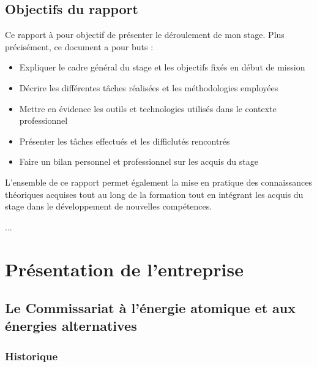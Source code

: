 \documentclass[12pt,a4paper]{report}
\begin{document}
\section{Objectifs du rapport}
Ce rapport à pour objectif de présenter le déroulement de mon stage. Plus précisément, ce document a pour buts :
\begin{itemize}
  \item Expliquer le cadre général du stage et les objectifs fixés en début de mission
  \item Décrire les différentes tâches réalisées et les méthodologies employées
  \item Mettre en évidence les outils et technologies utilisés dans le contexte professionnel
  \item Présenter les tâches effectués et les difficlutés rencontrés
  \item Faire un bilan personnel et professionnel sur les acquis du stage
\end{itemize}

L'ensemble de ce rapport permet également la mise en pratique des connaissances théoriques acquises tout au long de la formation tout en intégrant les acquis du stage dans le développement de nouvelles compétences.

... %

\chapter{Présentation de l'entreprise}
\section{Le Commissariat à l'énergie atomique et aux énergies alternatives}
\subsection{Historique}
\end{document}
